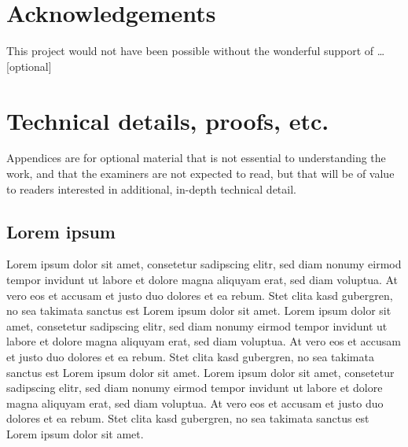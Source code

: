 \documentclass[12pt,a4paper,twoside]{report}
\newif\ifsubmission %
\begin{document}

\ifsubmission\else

\chapter*{Acknowledgements}

This project would not have been possible without the wonderful
support of \ldots [optional]

\fi
\cleardoublepage %

\tableofcontents













\label{lastcontentpage} %




\appendix

\chapter{Technical details, proofs, etc.}

Appendices are for optional material that is not essential to
understanding the work, and that the examiners are not expected to
read, but that will be of value to readers interested in additional,
in-depth technical detail.

\section{Lorem ipsum}

Lorem ipsum dolor sit amet, consetetur sadipscing elitr, sed diam
nonumy eirmod tempor invidunt ut labore et dolore magna aliquyam erat,
sed diam voluptua. At vero eos et accusam et justo duo dolores et ea
rebum. Stet clita kasd gubergren, no sea takimata sanctus est Lorem
ipsum dolor sit amet. Lorem ipsum dolor sit amet, consetetur
sadipscing elitr, sed diam nonumy eirmod tempor invidunt ut labore et
dolore magna aliquyam erat, sed diam voluptua. At vero eos et accusam
et justo duo dolores et ea rebum. Stet clita kasd gubergren, no sea
takimata sanctus est Lorem ipsum dolor sit amet. Lorem ipsum dolor sit
amet, consetetur sadipscing elitr, sed diam nonumy eirmod tempor
invidunt ut labore et dolore magna aliquyam erat, sed diam voluptua.
At vero eos et accusam et justo duo dolores et ea rebum. Stet clita
kasd gubergren, no sea takimata sanctus est Lorem ipsum dolor sit
amet.
\end{document}
